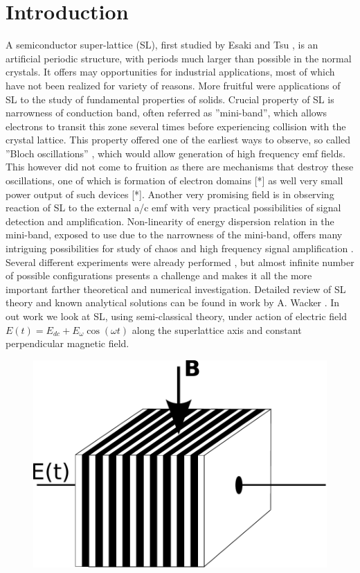 \documentclass[40pt,letterpaper,physrev]{article}
\begin{document}
  \section{Introduction}  
A semiconductor super-lattice (SL), first studied by Esaki and Tsu \cite{Esaki:70}, is an artificial periodic structure, with periods
much larger than possible in the normal crystals. It offers may opportunities for industrial applications, most of which
have not been realized for variety of reasons. More fruitful were applications of SL to the study of fundamental
properties of solids. Crucial property of SL is narrowness of conduction band, often referred as ”mini-band”, which
allows electrons to transit this zone several times before experiencing collision with the crystal lattice. This property
offered one of the earliest ways to observe, so called ”Bloch oscillations” \cite{BLOCH}, which would allow generation of
high frequency emf fields. This however did not come to fruition as there are mechanisms that destroy these oscillations,
one of which is formation of electron domains [*] as well very small power output of such devices [*].
Another very promising field is in observing reaction of SL to the external a/c emf with very practical possibilities
of signal detection and amplification. Non-linearity of energy dispersion relation in the mini-band, exposed to use due
to the narrowness of the mini-band, offers many intriguing possibilities for study of chaos \cite{Alekseev2002281} and high frequency signal amplification \cite{PhysRevB.77.165330}. Several different experiments were already 
performed \cite{PhysRevB.56.10303}, but almost infinite number of possible
configurations presents a challenge and makes it all the more important farther theoretical and numerical investigation.
Detailed review of SL theory and known analytical solutions can be found in work by A. Wacker \cite{WAC01}.
In out work we look at SL, using semi-classical theory, under action of electric field 
$E(t) = E_{dc} + E_{\omega}\cos(\omega t)$ along the superlattice axis and constant perpendicular magnetic field.
  	\begin{figure}[H]
	  \centering
	  \normalsize %
	  \includegraphics[scale=0.7]{illustrations/SL_CROSS_E_AND_B.pdf}
	  \caption{}
	\end{figure}
\end{document}
